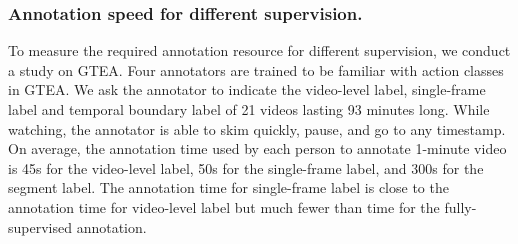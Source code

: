 \documentclass[runningheads]{llncs}
\begin{document}
	\subsubsection{Annotation speed for different supervision.}
	To measure the required annotation resource for different supervision, we conduct a study on GTEA. Four annotators are trained to be familiar with action classes in GTEA. We ask the annotator to indicate the video-level label, single-frame label and temporal boundary label of 21 videos lasting 93 minutes long. While watching, the annotator is able to skim quickly, pause, and go to any timestamp. On average, the annotation time used by each person to annotate 1-minute video is 45s for the video-level label, 50s for the single-frame label, and 300s for the segment label.
	The annotation time for single-frame label is close to the annotation time for video-level label but much fewer than time for the fully-supervised annotation.
	
\end{document}
